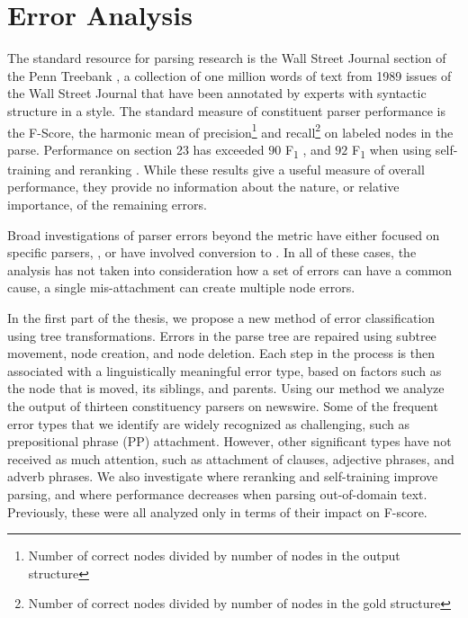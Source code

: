 \section{Error Analysis}

The standard resource for parsing research is the Wall Street Journal section of the Penn Treebank \parencite{ptb}, a collection of one million words of text from 1989 issues of the Wall Street Journal that have been annotated by experts with syntactic structure in a \gb style.
The standard measure of constituent parser performance is the F-Score, the harmonic mean of precision\footnote{Number of correct nodes divided by number of nodes in the output structure} and recall\footnote{Number of correct nodes divided by number of nodes in the gold structure}  on labeled nodes in the parse.
Performance on \wsj section 23 has exceeded $90$ F\textsubscript{1} \parencite{Petrov-Klein:2007}, and $92$ F\textsubscript{1} when using self-training and reranking \parencite{McClosky-Charniak-Johnson:2006,Charniak-Johnson:2005}. 
While these results give a useful measure of overall performance, they provide no information about the nature, or relative importance, of the remaining errors.

Broad investigations of parser errors beyond the \parseval metric \parencite{Black-etal:1991} have either focused on specific parsers, \myeg \parencite{Collins:2003}, or have involved conversion to \depgr \parencite{Carroll-etal:1998,King:2003}.
In all of these cases, the analysis has not taken into consideration how a set of errors can have a common cause, \myeg a single mis-attachment can create multiple node errors.

In the first part of the thesis, we propose a new method of error classification using tree transformations.
Errors in the parse tree are repaired using subtree movement, node creation, and node deletion.
Each step in the process is then associated with a linguistically meaningful error type, based on factors such as the node that is moved, its siblings, and parents.  
Using our method we analyze the output of thirteen constituency parsers on newswire.
Some of the frequent error types that we identify are widely recognized as challenging, such as prepositional phrase (PP) attachment.
However, other significant types have not received as much attention, such as attachment of clauses, adjective phrases, and adverb phrases.
We also investigate where reranking and self-training improve parsing, and where performance decreases when parsing out-of-domain text.
Previously, these were all analyzed only in terms of their impact on F-score.

